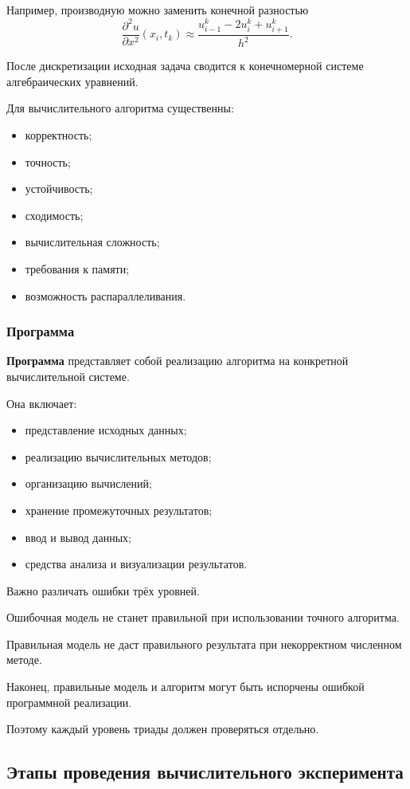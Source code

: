 Например, производную можно заменить конечной разностью
\[
\frac{\partial^2u}{\partial x^2}(x_i,t_k)
\approx
\frac{u_{i-1}^{k}-2u_i^{k}+u_{i+1}^{k}}{h^2}.
\]

После дискретизации исходная задача сводится к конечномерной системе алгебраических уравнений.

Для вычислительного алгоритма существенны:
\begin{itemize}
	\item корректность;
	\item точность;
	\item устойчивость;
	\item сходимость;
	\item вычислительная сложность;
	\item требования к памяти;
	\item возможность распараллеливания.
\end{itemize}

\subsubsection*{Программа}

\textbf{Программа} представляет собой реализацию алгоритма на конкретной вычислительной системе.

Она включает:
\begin{itemize}
	\item представление исходных данных;
	\item реализацию вычислительных методов;
	\item организацию вычислений;
	\item хранение промежуточных результатов;
	\item ввод и вывод данных;
	\item средства анализа и визуализации результатов.
\end{itemize}

Важно различать ошибки трёх уровней.

Ошибочная модель не станет правильной при использовании точного алгоритма.

Правильная модель не даст правильного результата при некорректном численном методе.

Наконец, правильные модель и алгоритм могут быть испорчены ошибкой программной реализации.

Поэтому каждый уровень триады должен проверяться отдельно.


\subsection{Этапы проведения вычислительного эксперимента}

